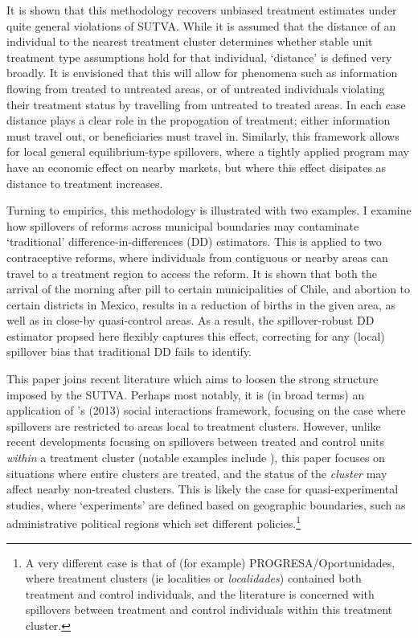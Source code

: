It is shown that this methodology recovers unbiased treatment
estimates under quite general violations of SUTVA.  While it is
assumed that the distance of an individual to the nearest treatment
cluster determines whether stable unit treatment type assumptions hold
for that individual, `distance' is defined very broadly.  It is
envisioned that this will allow for phenomena such as information
flowing from treated to untreated areas, or of untreated individuals
violating their treatment status by travelling from untreated to
treated areas.  In each case distance plays a clear role in the
propogation of treatment; either information must travel out, or
beneficiaries must travel in. Similarly, this framework allows for
local general equilibrium-type spillovers, where a tightly applied
program may have an economic effect on nearby markets, but where this
effect disipates as distance to treatment increases.

Turning to empirics, this methodology is illustrated with two examples.
I examine how spillovers of reforms across municipal boundaries may 
contaminate `traditional' difference-in-differences (DD) estimators.  This is 
applied to two contraceptive reforms, where individuals from contiguous or nearby 
areas can travel to a treatment region to access the reform.  It is shown that 
both the arrival of the morning after pill to certain municipalities of Chile, 
and abortion to certain districts in Mexico, results in a reduction of births in 
the given area, as well as in close-by quasi-control areas.  As a result, the 
spillover-robust DD estimator propsed here flexibly captures this effect, 
correcting for any (local) spillover bias that traditional DD fails to 
identify.

This paper joins recent literature which aims to loosen the strong structure 
imposed by the SUTVA.  Perhaps most notably, it is (in broad terms) an 
application of \citeauthor{Manski2013}'s (2013) social interactions framework, 
focusing on the case where spillovers are restricted to areas local to treatment 
clusters.  However, unlike recent developments focusing on spillovers 
between treated and control units \emph{within} a treatment cluster (notable
examples include \citet{McIntosh2008,Bairdetal2014,AngelucciDiMaro2010}), this 
paper focuses on situations where entire clusters are treated, and the status
of the \emph{cluster} may affect nearby non-treated clusters.  This is likely
the case for quasi-experimental studies, where `experiments' are defined based
on geographic boundaries, such as administrative political regions which set 
different policies.\footnote{A very different case is that of (for example)
PROGRESA/Oportunidades, where treatment clusters (ie localities or 
\emph{localidades}) contained both treatment and control individuals, and the
literature is concerned with spillovers between treatment and control individuals
within this treatment cluster.}

